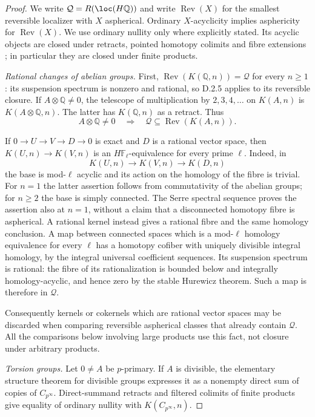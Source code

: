\begin{proof}
We write $\mathcal Q=R(\loc(H\mathbb Q))$ and write
$\operatorname{Rev}(X)$ for the smallest reversible localizer with
$X$ aspherical.  Ordinary $X$-acyclicity implies asphericity for
$\operatorname{Rev}(X)$.  We use ordinary nullity only where explicitly
stated.  Its acyclic objects are closed under retracts, pointed
homotopy colimits and fibre extensions
\citep[beginning of Section~5]{EH5Bousfield1997}; in particular they
are closed under finite products.

\medskip\noindent
\emph{Rational changes of abelian groups.}
First, $\operatorname{Rev}(K(\mathbb Q,n))=\mathcal Q$ for every
$n\geq1$: its suspension spectrum is nonzero and rational, so D.2.5
applies to its reversible closure.  If $A\otimes\mathbb Q\ne0$,
the telescope of multiplication by $2,3,4,\ldots$ on $K(A,n)$ is
$K(A\otimes\mathbb Q,n)$.  The latter has $K(\mathbb Q,n)$ as a
retract.  Thus
\[
 A\otimes\mathbb Q\ne0\quad\Longrightarrow\quad
                \mathcal Q\subseteq\operatorname{Rev}(K(A,n)).
 \tag{D.3.7d}
\]

If $0\to U\to V\to D\to0$ is exact and $D$ is a rational vector
space, then $K(U,n)\to K(V,n)$ is an $H\mathbb F_\ell$-equivalence
for every prime $\ell$.  Indeed, in
\[
 K(U,n)\longrightarrow K(V,n)\longrightarrow K(D,n)
\]
the base is mod-$\ell$ acyclic and its action on the homology of the
fibre is trivial.  For $n=1$ the latter assertion follows from
commutativity of the abelian groups; for $n\geq2$ the base is simply
connected.  The Serre spectral sequence proves the assertion also at
$n=1$, without a claim that a disconnected homotopy fibre is
aspherical.  A rational kernel instead gives a rational fibre and the
same homology conclusion.  A map between connected spaces which is a
mod-$\ell$ homology equivalence for every $\ell$ has a homotopy
cofiber with uniquely divisible integral homology, by the integral
universal coefficient sequences.  Its suspension spectrum is
rational: the fibre of its rationalization is bounded below and
integrally homology-acyclic, and hence zero by the stable Hurewicz
theorem.  Such a map is therefore in $\mathcal Q$.

Consequently kernels or cokernels which are rational vector spaces
may be discarded when comparing reversible aspherical classes that
already contain $\mathcal Q$.  All the comparisons below involving
large products use this fact, not closure under arbitrary products.

\medskip\noindent
\emph{Torsion groups.}
Let $0\ne A$ be $p$-primary.  If $A$ is divisible, the elementary
structure theorem for divisible groups expresses it as a nonempty
direct sum of copies of $C_{p^\infty}$.  Direct-summand retracts and
filtered colimits of finite products give equality of ordinary
nullity with $K(C_{p^\infty},n)$.


\end{proof}

